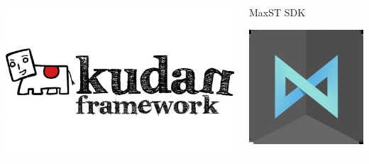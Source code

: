 \begin{frame}
\begin{columns}
\begin{column}{0.3\textwidth}
\begin{center}
						\includegraphics[width=0.8\linewidth]{Images/kudan}
					\end{center}
			\end{column}
			\begin{column}{0.3\textwidth}
				\begin{center}
					MaxST SDK
				\end{center}
				\vspace{3mm}
				\vfill 
					\begin{center}
						\includegraphics[width=0.5\linewidth]{Images/maxst}
					\end{center}
			\end{column}
		\end{columns}
	\endblock{}
\end{frame}

